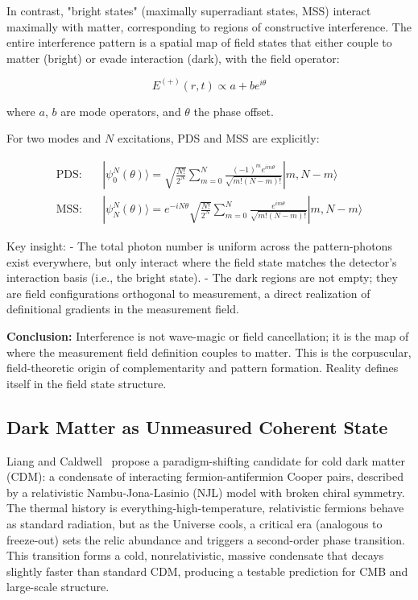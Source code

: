 In contrast, "bright states" (maximally superradiant states, MSS) interact maximally with matter, corresponding to regions of constructive interference. The entire interference pattern is a spatial map of field states that either couple to matter (bright) or evade interaction (dark), with the field operator:

\begin{equation}
E^{(+)}(r, t) \propto a + b e^{i\theta}
\end{equation}

where $a$, $b$ are mode operators, and $\theta$ the phase offset. 

For two modes and $N$ excitations, PDS and MSS are explicitly:

\begin{align}
\text{PDS:}\quad & |\psi^N_0(\theta)\rangle = \sqrt{\frac{N!}{2^N}} \sum_{m=0}^{N} \frac{(-1)^m e^{im\theta}}{\sqrt{m!(N-m)!}} |m, N-m\rangle \\
\text{MSS:}\quad & |\psi^N_N(\theta)\rangle = e^{-iN\theta} \sqrt{\frac{N!}{2^N}} \sum_{m=0}^{N} \frac{e^{im\theta}}{\sqrt{m!(N-m)!}} |m, N-m\rangle
\end{align}

Key insight:  
- The total photon number is uniform across the pattern-photons exist everywhere, but only interact where the field state matches the detector's interaction basis (i.e., the bright state).  
- The dark regions are not empty; they are field configurations orthogonal to measurement, a direct realization of definitional gradients in the measurement field.

\textbf{Conclusion:}  
Interference is not wave-magic or field cancellation; it is the map of where the measurement field definition couples to matter. This is the corpuscular, field-theoretic origin of complementarity and pattern formation. Reality defines itself in the field state structure.


\subsection{Dark Matter as Unmeasured Coherent State}

Liang and Caldwell~\cite{liang_cold_2025} propose a paradigm-shifting candidate for cold dark matter (CDM): a condensate of interacting fermion-antifermion Cooper pairs, described by a relativistic Nambu-Jona-Lasinio (NJL) model with broken chiral symmetry. The thermal history is everything-high-temperature, relativistic fermions behave as standard radiation, but as the Universe cools, a critical era (analogous to freeze-out) sets the relic abundance and triggers a second-order phase transition. This transition forms a cold, nonrelativistic, massive condensate that decays slightly faster than standard CDM, producing a testable prediction for CMB and large-scale structure.

